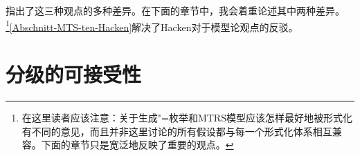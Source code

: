  \citet{PS2001a} 指出了这三种观点的多种差异。在下面的章节中，我会着重论述其中两种差异。 \footnote{%
	在这里读者应该注意：关于生成"=枚举和MTRS模型应该怎样最好地被形式化有不同的意见，而且并非这里讨论的所有假设都与每一个形式化体系相互兼容。下面的章节只是宽泛地反映了重要的观点。%
}\ref{Abschnitt-MTS-ten-Hacken}解决了Hacken对于模型论观点的反驳。

\section{分级的可接受性}

